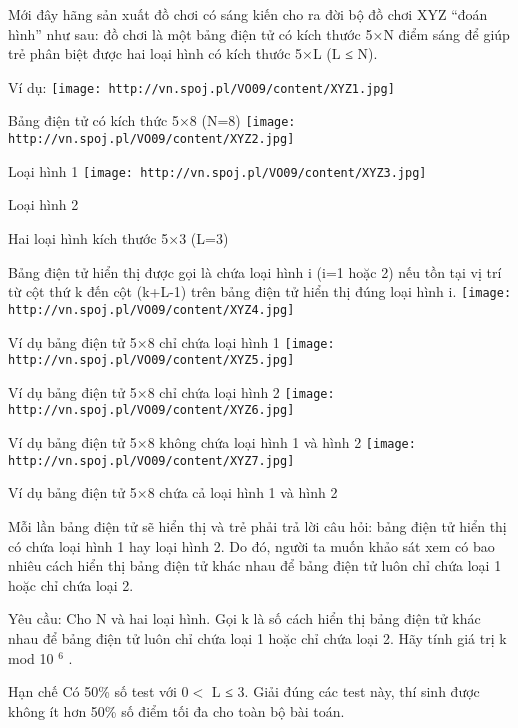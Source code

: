 Mới đây hãng sản xuất đồ chơi có sáng kiến cho ra đời bộ đồ chơi XYZ “đoán hình” như sau: đồ chơi là một bảng điện tử có kích thước 5×N điểm sáng để giúp trẻ phân biệt được hai loại hình có kích thước 5×L (L ≤ N).  

   Ví dụ:  
\texttt{[image: http://vn.spoj.pl/VO09/content/XYZ1.jpg]}

               Bảng điện tử có kích thức 5×8 (N=8)             
\texttt{[image: http://vn.spoj.pl/VO09/content/XYZ2.jpg]}

                       Loại hình 1                     
\texttt{[image: http://vn.spoj.pl/VO09/content/XYZ3.jpg]}

                       Loại hình 2                     

                       Hai loại hình kích thước 5×3 (L=3)                     

   Bảng điện tử hiển thị được gọi là chứa loại hình i (i=1 hoặc 2) nếu tồn tại vị trí từ cột thứ k đến cột (k+L-1) trên bảng điện tử hiển thị đúng loại hình i.  
\texttt{[image: http://vn.spoj.pl/VO09/content/XYZ4.jpg]}

               Ví dụ bảng điện tử 5×8 chỉ chứa loại hình 1             
\texttt{[image: http://vn.spoj.pl/VO09/content/XYZ5.jpg]}

               Ví dụ bảng điện tử 5×8 chỉ chứa loại hình 2             
\texttt{[image: http://vn.spoj.pl/VO09/content/XYZ6.jpg]}

               Ví dụ bảng điện tử 5×8  không chứa loại hình 1 và hình 2             
\texttt{[image: http://vn.spoj.pl/VO09/content/XYZ7.jpg]}

               Ví dụ bảng điện tử 5×8  chứa cả loại hình 1 và hình 2             

   Mỗi lần bảng điện tử sẽ hiển thị và trẻ phải trả lời câu hỏi: bảng điện tử hiển thị có chứa loại hình 1 hay loại hình 2. Do đó, người ta muốn khảo sát xem có bao nhiêu cách hiển thị bảng điện tử khác nhau để bảng điện tử luôn chỉ chứa loại 1 hoặc chỉ chứa loại 2.  

   Yêu cầu: Cho N và hai loại hình. Gọi k là số cách hiển thị bảng điện tử khác nhau để bảng điện tử luôn chỉ chứa loại 1 hoặc chỉ chứa loại 2. Hãy tính giá trị k  mod 10   $^    6   $   .  

Hạn chế
Có 50\% số test với 0$<$ L ≤ 3. Giải đúng các test này, thí sinh được không ít hơn 50\% số điểm tối đa cho toàn bộ bài toán.